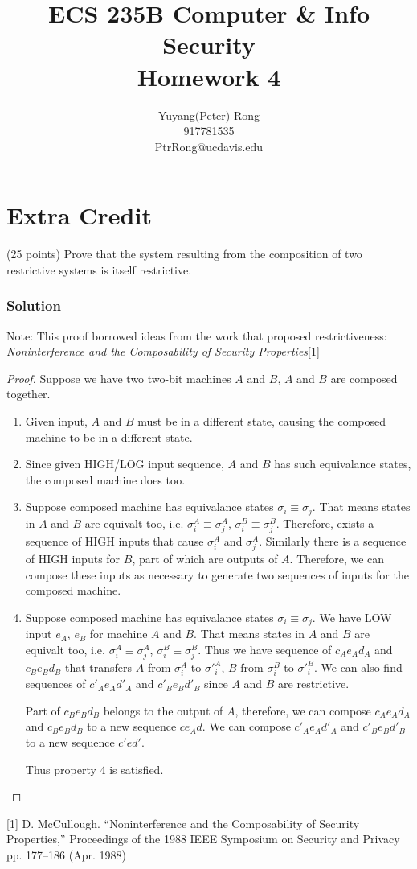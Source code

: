 \documentclass{article}
\title{ECS 235B Computer \& Info Security \\ Homework 4}
\author{Yuyang(Peter) Rong \\917781535 \\ PtrRong@ucdavis.edu}
\begin{document}
\maketitle

\section*{Extra Credit}
(25 points) Prove that the system resulting from the composition of two restrictive systems is itself restrictive.

\subsubsection*{Solution}

Note: This proof borrowed ideas from the work that proposed restrictiveness: \textit{Noninterference and the Composability of Security Properties}[1]

\begin{proof}
    Suppose we have two two-bit machines $A$ and $B$, $A$ and $B$ are composed together.
    \begin{enumerate}
        \item Given input, $A$ and $B$ must be in a different state, causing the composed machine to be in a different state.
        
        \item Since given HIGH/LOG input sequence, $A$ and $B$ has such equivalance states, the composed machine does too.
        
        \item Suppose composed machine has equivalance states $\sigma_i \equiv\sigma_j$. 
        That means states in $A$ and $B$ are equivalt too, i.e. $\sigma^A_i \equiv \sigma^A_j$, $\sigma^B_i \equiv \sigma^B_j$.
        Therefore, exists a sequence of HIGH inputs that cause $\sigma^A_i$ and $\sigma^A_j$. 
        Similarly there is a sequence of HIGH inputs for $B$, part of which are outputs of $A$.
        Therefore, we can compose these inputs as necessary to generate two sequences of inputs for the composed machine.
        
        \item Suppose composed machine has equivalance states $\sigma_i \equiv\sigma_j$. 
        We have LOW input $e_A$, $e_B$ for machine $A$ and $B$.
        That means states in $A$ and $B$ are equivalt too, i.e. $\sigma^A_i \equiv \sigma^A_j$, $\sigma^B_i \equiv \sigma^B_j$.
        Thus we have sequence of $c_Ae_Ad_A$ and $c_Be_Bd_B$ that transfers $A$ from $\sigma^A_i$ to $\sigma'^A_i$, $B$ from $\sigma^B_i$ to $\sigma'^B_i$.
        We can also find sequences of $c'_Ae_Ad'_A$ and $c'_Be_Bd'_B$ since $A$ and $B$ are restrictive.
        
        Part of $c_Be_Bd_B$ belongs to the output of $A$, therefore, we can compose $c_Ae_Ad_A$ and $c_Be_Bd_B$ to a new sequence $ce_Ad$.
        We can compose $c'_Ae_Ad'_A$ and $c'_Be_Bd'_B$ to a new sequence $c'ed'$.
        
        Thus property 4 is satisfied.
    \end{enumerate}
\end{proof}


[1] D. McCullough. “Noninterference and the Composability of Security Properties,” Proceedings of the 1988 IEEE Symposium on Security and Privacy pp. 177–186 (Apr. 1988)
\end{document}
